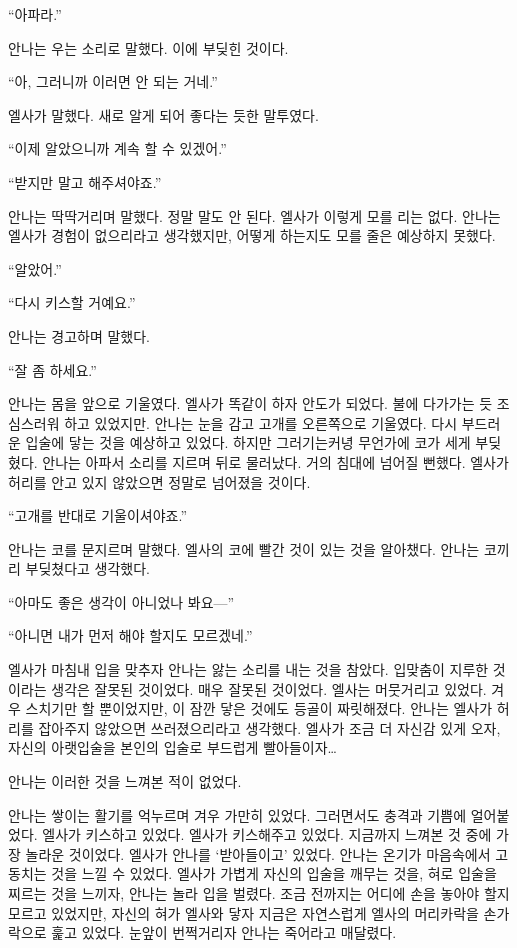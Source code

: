 ``아파라.''

안나는 우는 소리로 말했다. 이에 부딪힌 것이다.

``아, 그러니까 이러면 안 되는 거네.''

엘사가 말했다. 새로 알게 되어 좋다는 듯한 말투였다.

``이제 알았으니까 계속 할 수 있겠어.''

``받지만 말고 해주셔야죠.''

안나는 딱딱거리며 말했다. 정말 말도 안 된다. 엘사가 이렇게 모를 리는 없다. 안나는 엘사가 경험이 없으리라고 생각했지만, 어떻게 하는지도 모를 줄은 예상하지 못했다.

``알았어.''

``다시 키스할 거예요.''

안나는 경고하며 말했다.

``잘 좀 하세요.''

안나는 몸을 앞으로 기울였다. 엘사가 똑같이 하자 안도가 되었다. 불에 다가가는 듯 조심스러워 하고 있었지만. 안나는 눈을 감고 고개를 오른쪽으로 기울였다. 다시 부드러운 입술에 닿는 것을 예상하고 있었다. 하지만 그러기는커녕 무언가에 코가 세게 부딪혔다. 안나는 아파서 소리를 지르며 뒤로 물러났다. 거의 침대에 넘어질 뻔했다. 엘사가 허리를 안고 있지 않았으면 정말로 넘어졌을 것이다.

``고개를 반대로 기울이셔야죠.''

안나는 코를 문지르며 말했다. 엘사의 코에 빨간 것이 있는 것을 알아챘다. 안나는 코끼리 부딪쳤다고 생각했다.

``아마도 좋은 생각이 아니었나 봐요—''

``아니면 내가 먼저 해야 할지도 모르겠네.''

엘사가 마침내 입을 맞추자 안나는 앓는 소리를 내는 것을 참았다. 입맞춤이 지루한 것이라는 생각은 잘못된 것이었다. 매우 잘못된 것이었다. 엘사는 머뭇거리고 있었다. 겨우 스치기만 할 뿐이었지만, 이 잠깐 닿은 것에도 등골이 짜릿해졌다. 안나는 엘사가 허리를 잡아주지 않았으면 쓰러졌으리라고 생각했다. 엘사가 조금 더 자신감 있게 오자, 자신의 아랫입술을 본인의 입술로 부드럽게 빨아들이자\ldots

안나는 이러한 것을 느껴본 적이 없었다.

안나는 쌓이는 활기를 억누르며 겨우 가만히 있었다. 그러면서도 충격과 기쁨에 얼어붙었다. 엘사가 키스하고 있었다. 엘사가 키스해주고 있었다. 지금까지 느껴본 것 중에 가장 놀라운 것이었다. 엘사가 안나를 `받아들이고' 있었다. 안나는 온기가 마음속에서 고동치는 것을 느낄 수 있었다. 엘사가 가볍게 자신의 입술을 깨무는 것을, 혀로 입술을 찌르는 것을 느끼자, 안나는 놀라 입을 벌렸다. 조금 전까지는 어디에 손을 놓아야 할지 모르고 있었지만, 자신의 혀가 엘사와 닿자 지금은 자연스럽게 엘사의 머리카락을 손가락으로 훑고 있었다. 눈앞이 번쩍거리자 안나는 죽어라고 매달렸다.

